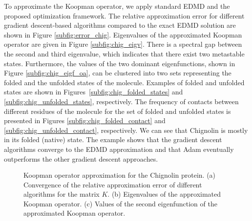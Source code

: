 \documentclass
[
    a4paper,
    DIV=11,
    abstract=true,
    11pt,
]
{scrartcl}
\theoremstyle{definition}
\begin{document}
To approximate the Koopman operator, we apply standard EDMD and the proposed optimization framework. The relative approximation error for different gradient descent-based algorithms compared to the exact EDMD solution are shown in Figure \ref{subfig:error_chig}. Eigenvalues of the approximated Koopman operator are given in Figure \ref{subfig:chig_eigv}. There is a spectral gap between the second and third eigenvalue, which indicates that there exist two metastable states. Furthermore, the values of the two dominant eigenfunctions, shown in Figure \ref{subfig:chig_eigf_oa}, can be clustered into two sets representing the folded and the unfolded states of the molecule. Examples of folded and unfolded states are shown in Figures~\ref{subfig:chig_folded_states} and \ref{subfig:chig_unfolded_states}, respectively. The frequency of contacts between different residues of the molecule for the set of folded and unfolded states is presented in Figures \ref{subfig:chig_folded_contact} and \ref{subfig:chig_unfolded_contact}, respectively. We can see that Chignolin is mostly in its folded (native) state. The example shows that the gradient descent algorithms converge to the EDMD approximation and that Adam eventually outperforms the other gradient descent approaches.

\begin{figure}
    \centering
    \quad
    \quad
    \quad
    \caption{Koopman operator approximation for the Chignolin protein. (a) Convergence of the relative approximation error of different algorithms for the matrix $K$. (b) Eigenvalues of the approximated Koopman operator. (c) Values of the second eigenfunction of the approximated Koopman operator.}
    \label{fig:chig_results}
\end{figure}
\end{document}

